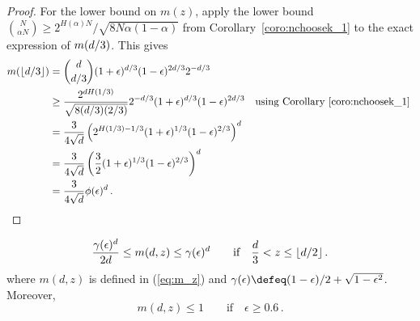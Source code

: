 \begin{proof}

For the lower bound on $m(z)$, apply the lower bound ${N \choose \alpha N} \geq 2^{H(\alpha)N}/\sqrt{8N\alpha (1-\alpha)}$ from Corollary~\ref{coro:nchoosek_1} to the exact expression of $m( d/3)$. This gives 
\begin{align*}
m( \lfloor d/3 \rfloor )
&= {d \choose d/3} 
(1+\epsilon)^{d/3} 
(1-\epsilon)^{2d/3} 
2^{-d/3} \nonumber \\
&\geq \frac{2^{d H(1/3)}}{\sqrt{8(d/3)(2/3)}} 2^{-d/3} 
(1+\epsilon)^{d/3} 
(1-\epsilon)^{2d/3} 
\nonumber \quad \text{using Corollary~\ref{coro:nchoosek_1} } \\
&= \frac{3}{4\sqrt{d}}\left(2^{H(1/3) - 1/3} (1+\epsilon)^{1/3} (1-\epsilon)^{2/3}\right)^d \nonumber \\
&= \frac{3}{4\sqrt{d}}\left(\frac{3}{2} (1+\epsilon)^{1/3} (1-\epsilon)^{2/3}\right)^d \\
&= \frac{3}{4\sqrt{d}}\phi(\epsilon)^d \, .
\end{align*}

\end{proof}







\begin{claim}\label{claim:t2star-exact}
\[
\frac{\gamma(\epsilon)^d}{2d}
\leq
m(d, z) 
\leq
\gamma(\epsilon)^d 
\qquad \text{if}\quad \frac{d}{3} < z \leq \lfloor d/2 \rfloor
\, .
\]
where $m(d, z)$ is defined in (\ref{eq:m_z}) and $\gamma(\epsilon) \defeq (1-\epsilon)/2 + \sqrt{1-\epsilon^2}$. Moreover, 
\[
m(d, z) \leq 1
\qquad \text{if}\quad \epsilon \geq 0.6\,.
\]
\end{claim}

